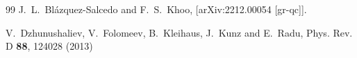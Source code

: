 \documentclass[a4paper,12pt]{article}
\begin{document}
\begin{thebibliography}{99}
J.~L.~Bl\'azquez-Salcedo and F.~S.~Khoo,
[arXiv:2212.00054 [gr-qc]].

V.~Dzhunushaliev, V.~Folomeev, B.~Kleihaus, J.~Kunz and E.~Radu,
Phys. Rev. D \textbf{88}, 124028 (2013)



\end{thebibliography}
\end{document}
